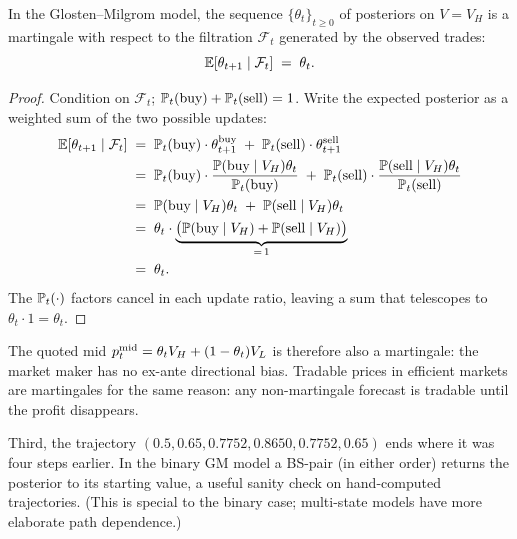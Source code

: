 \begin{proposition}
\label{prop:gm_martingale}
In the Glosten--Milgrom model, the sequence $\{\theta_t\}_{t \geq 0}$
of posteriors on $V = V_H$ is a martingale with respect to the
filtration $\mathcal{F}_t$ generated by the observed trades:
\[
  \mathbb{E}[\theta_{t+1} \mid \mathcal{F}_t] \;=\; \theta_t.
\]
\end{proposition}
\begin{proof}
Condition on $\mathcal{F}_t$; $\mathbb{P}_t(\text{buy}) +
\mathbb{P}_t(\text{sell}) = 1$. Write the expected posterior as a
weighted sum of the two possible updates:
\begin{align*}
  \mathbb{E}[\theta_{t+1} \mid \mathcal{F}_t]
  \;&=\; \mathbb{P}_t(\text{buy}) \cdot \theta_{t+1}^{\text{buy}}
       \;+\; \mathbb{P}_t(\text{sell}) \cdot \theta_{t+1}^{\text{sell}} \\
  \;&=\; \mathbb{P}_t(\text{buy}) \cdot \frac{\mathbb{P}(\text{buy} \mid V_H) \theta_t}{\mathbb{P}_t(\text{buy})}
       \;+\; \mathbb{P}_t(\text{sell}) \cdot \frac{\mathbb{P}(\text{sell} \mid V_H) \theta_t}{\mathbb{P}_t(\text{sell})} \\
  \;&=\; \mathbb{P}(\text{buy} \mid V_H) \theta_t \;+\; \mathbb{P}(\text{sell} \mid V_H) \theta_t \\
  \;&=\; \theta_t \cdot \underbrace{\bigl(\mathbb{P}(\text{buy} \mid V_H) + \mathbb{P}(\text{sell} \mid V_H)\bigr)}_{=\,1} \\
  \;&=\; \theta_t.
\end{align*}
The $\mathbb{P}_t(\cdot)$ factors cancel in each update ratio, leaving
a sum that telescopes to $\theta_t \cdot 1 = \theta_t$.
\qedhere
\end{proof}

The quoted mid $p^{\mathrm{mid}}_t = \theta_t V_H + (1 - \theta_t) V_L$ is
therefore also a martingale: the market maker has no ex-ante
directional bias. Tradable prices in efficient markets are
martingales for the same reason: any non-martingale forecast is
tradable until the profit disappears.

Third, the trajectory $(0.5, 0.65, 0.7752, 0.8650, 0.7752, 0.65)$
ends where it was four steps earlier. In the binary GM model a
BS-pair (in either order) returns the posterior to its starting
value, a useful sanity check on hand-computed trajectories.
(This is special to the binary case; multi-state models have more
elaborate path dependence.)

